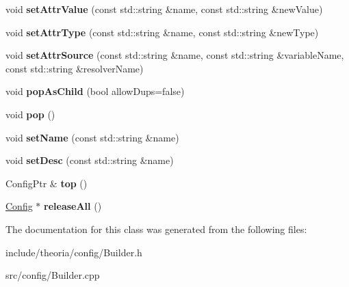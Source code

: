 \begin{DoxyCompactItemize}
\item 
\hypertarget{classtheoria_1_1config_1_1ConfigBuilder_adcdd668ab4958497e7328b02ad8f8f83}{void {\bfseries set\+Attr\+Value} (const std\+::string \&name, const std\+::string \&new\+Value)}\label{classtheoria_1_1config_1_1ConfigBuilder_adcdd668ab4958497e7328b02ad8f8f83}

\item 
\hypertarget{classtheoria_1_1config_1_1ConfigBuilder_a019902280637cd43d9a69acb678a5967}{void {\bfseries set\+Attr\+Type} (const std\+::string \&name, const std\+::string \&new\+Type)}\label{classtheoria_1_1config_1_1ConfigBuilder_a019902280637cd43d9a69acb678a5967}

\item 
\hypertarget{classtheoria_1_1config_1_1ConfigBuilder_af30b50a47285d06afae1b74edfb4d762}{void {\bfseries set\+Attr\+Source} (const std\+::string \&name, const std\+::string \&variable\+Name, const std\+::string \&resolver\+Name)}\label{classtheoria_1_1config_1_1ConfigBuilder_af30b50a47285d06afae1b74edfb4d762}

\item 
\hypertarget{classtheoria_1_1config_1_1ConfigBuilder_acd995045c0bf17d35da9573cf53ec791}{void {\bfseries pop\+As\+Child} (bool allow\+Dups=false)}\label{classtheoria_1_1config_1_1ConfigBuilder_acd995045c0bf17d35da9573cf53ec791}

\item 
\hypertarget{classtheoria_1_1config_1_1ConfigBuilder_accda8a312be22d56b33adb47d5b266e9}{void {\bfseries pop} ()}\label{classtheoria_1_1config_1_1ConfigBuilder_accda8a312be22d56b33adb47d5b266e9}

\item 
\hypertarget{classtheoria_1_1config_1_1ConfigBuilder_a19eea792ee2bc01c44806d2a5a9f666c}{void {\bfseries set\+Name} (const std\+::string \&name)}\label{classtheoria_1_1config_1_1ConfigBuilder_a19eea792ee2bc01c44806d2a5a9f666c}

\item 
\hypertarget{classtheoria_1_1config_1_1ConfigBuilder_a2582791fc33c6c4e700adbb615bb17a1}{void {\bfseries set\+Desc} (const std\+::string \&name)}\label{classtheoria_1_1config_1_1ConfigBuilder_a2582791fc33c6c4e700adbb615bb17a1}

\item 
\hypertarget{classtheoria_1_1config_1_1ConfigBuilder_a394d42770a90532be340a8af46868f79}{Config\+Ptr \& {\bfseries top} ()}\label{classtheoria_1_1config_1_1ConfigBuilder_a394d42770a90532be340a8af46868f79}

\item 
\hypertarget{classtheoria_1_1config_1_1ConfigBuilder_a06911a804a22e89101dab7ca3a08b049}{\hyperlink{classtheoria_1_1config_1_1Config}{Config} $\ast$ {\bfseries release\+All} ()}\label{classtheoria_1_1config_1_1ConfigBuilder_a06911a804a22e89101dab7ca3a08b049}

\end{DoxyCompactItemize}


The documentation for this class was generated from the following files\+:\begin{DoxyCompactItemize}
\item 
include/theoria/config/Builder.\+h\item 
src/config/Builder.\+cpp\end{DoxyCompactItemize}
